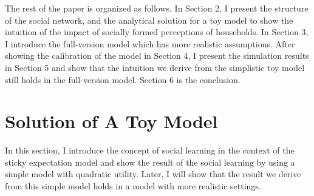 \documentclass[12pt,letterpaper]{article}
\begin{document}
The rest of the paper is organized as follows. In Section 2, I present the structure of the social network, and the analytical solution for a toy model to show the intuition of the impact of socially formed perceptions of households. In Section 3, I introduce the full-version model which has more realistic assumptions. After showing the calibration of the model in Section 4, I present the simulation results in Section 5 and show that the intuition we derive from the simplistic toy model still holds in the full-version model. Section 6 is the conclusion.

\section{Solution of A Toy Model}
In this section, I introduce the concept of social learning in the context of the sticky expectation model and show the result of the social learning by using a simple model with quadratic utility. Later, I will show that the result we derive from this simple model holds in a model with more realistic settings.
\end{document}

